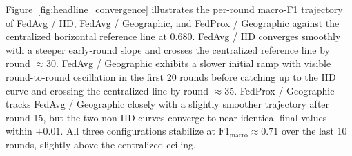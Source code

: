 \documentclass[conference]{IEEEtran}
\begin{document}
\begin{table}[!htbp]
\centering
\caption{Learning-architecture comparison at $N=5$ fusion centers, seed = 42. Centralized values are from the run's final-epoch evaluation. Local-only values are the mean across the 5 per-jurisdiction isolated models (each trained on its own geographic partition only), with per-client standard deviation in parentheses to expose the cross-jurisdictional spread. Federated values are the mean over the last 10 of 50 rounds.}
\label{tab:learning_arch_results}
\small
\setlength{\tabcolsep}{4pt}
\end{table}

Figure~\ref{fig:headline_convergence} illustrates the per-round macro-F1 trajectory of FedAvg / IID, FedAvg / Geographic, and FedProx / Geographic against the centralized horizontal reference line at $0.680$. FedAvg / IID converges smoothly with a steeper early-round slope and crosses the centralized reference line by round $\approx 30$. FedAvg / Geographic exhibits a slower initial ramp with visible round-to-round oscillation in the first 20 rounds before catching up to the IID curve and crossing the centralized line by round $\approx 35$. FedProx / Geographic tracks FedAvg / Geographic closely with a slightly smoother trajectory after round 15, but the two non-IID curves converge to near-identical final values within $\pm 0.01$. All three configurations stabilize at $\mathrm{F1}_{\text{macro}} \approx 0.71$ over the last 10 rounds, slightly above the centralized ceiling.
\end{document}
